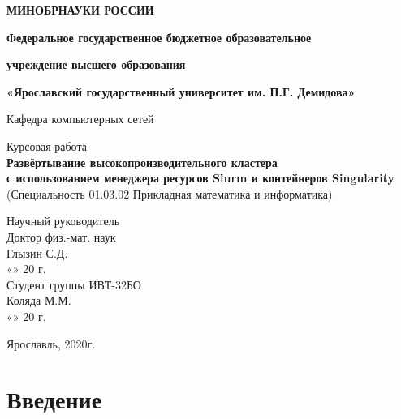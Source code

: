 \documentclass[a4paper]{extarticle}
\begin{document}
%
%
%
\begin{titlepage}
\fontsize{14pt}{12pt}
\begin{center}
\large
\textbf{МИНОБРНАУКИ РОССИИ}
\vspace{0.5cm}
			
\textbf{Федеральное государственное бюджетное образовательное}
		
\textbf{учреждение высшего образования}
		
\textbf{«Ярославский государственный университет им. П.Г. Демидова»}
\vspace{0.25cm}
			
			
Кафедра компьютерных сетей
\vfill
			
Курсовая работа \\
\textbf{Развёртывание высокопроизводительного кластера} \\
\textbf{с использованием менеджера ресурсов Slurm и контейнеров Singularity} \\
(Специальность 01.03.02 Прикладная математика и информатика) 
\vfill
\bigskip
\end{center}
\begin{flushright}
	Научный руководитель\\
	Доктор физ.-мат. наук\\
	Глызин С.Д. \underline{\hspace{2cm}}\\
	 «\underline{\hspace{0.5cm}}» \underline{\hspace{1.5cm}} 20 \underline{\hspace{0.4cm}} г.\\
	Студент группы ИВТ-32БО\\
	Коляда М.М. \underline{\hspace{2cm}}\\
	«\underline{\hspace{0.5cm}}» \underline{\hspace{1.5cm}} 20 \underline{\hspace{0.4cm}} г.\\
\end{flushright}
\begin{center}
Ярославль, 2020г.
\end{center}
\end{titlepage}

\pagestyle{empty}
\tableofcontents
\clearpage
\pagestyle{plain}

\section*{Введение}
\end{document}
